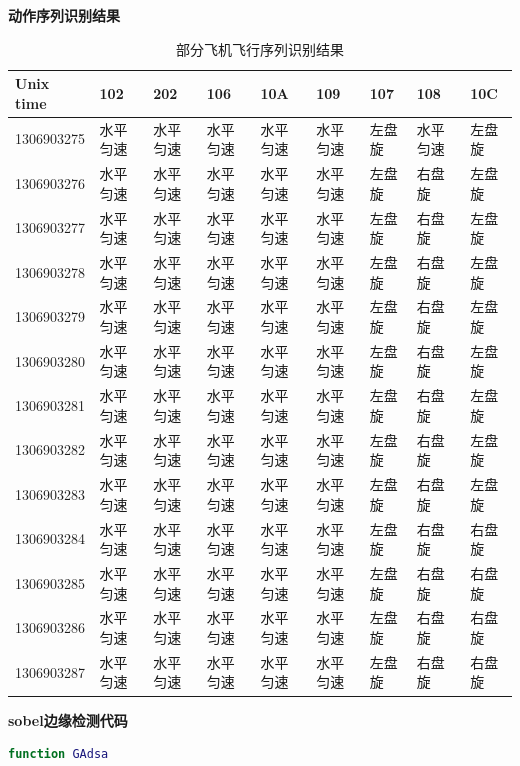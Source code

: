 \documentclass{my_paper}
\begin{document}
\textbf{动作序列识别结果}
\begin{table}
    \caption{部分飞机飞行序列识别结果} %
    \centering %
  
        \begin{tabular}{l|llllllll}
            \hline
        Unix time & 102 & 202 & 106 & 10A & 109 & 107 & 108 & 10C \\\hline
        1306903275 & 水平匀速 & 水平匀速 & 水平匀速 & 水平匀速 & 水平匀速 & 左盘旋 & 水平匀速 & 左盘旋 \\
        1306903276 & 水平匀速 & 水平匀速 & 水平匀速 & 水平匀速 & 水平匀速 & 左盘旋 & 右盘旋  & 左盘旋 \\
        1306903277 & 水平匀速 & 水平匀速 & 水平匀速 & 水平匀速 & 水平匀速 & 左盘旋 & 右盘旋  & 左盘旋 \\
        1306903278 & 水平匀速 & 水平匀速 & 水平匀速 & 水平匀速 & 水平匀速 & 左盘旋 & 右盘旋  & 左盘旋 \\
        1306903279 & 水平匀速 & 水平匀速 & 水平匀速 & 水平匀速 & 水平匀速 & 左盘旋 & 右盘旋  & 左盘旋 \\
        1306903280 & 水平匀速 & 水平匀速 & 水平匀速 & 水平匀速 & 水平匀速 & 左盘旋 & 右盘旋  & 左盘旋 \\
        1306903281 & 水平匀速 & 水平匀速 & 水平匀速 & 水平匀速 & 水平匀速 & 左盘旋 & 右盘旋  & 左盘旋 \\
        1306903282 & 水平匀速 & 水平匀速 & 水平匀速 & 水平匀速 & 水平匀速 & 左盘旋 & 右盘旋  & 左盘旋 \\
        1306903283 & 水平匀速 & 水平匀速 & 水平匀速 & 水平匀速 & 水平匀速 & 左盘旋 & 右盘旋  & 左盘旋 \\
        1306903284 & 水平匀速 & 水平匀速 & 水平匀速 & 水平匀速 & 水平匀速 & 左盘旋 & 右盘旋  & 右盘旋 \\
        1306903285 & 水平匀速 & 水平匀速 & 水平匀速 & 水平匀速 & 水平匀速 & 左盘旋 & 右盘旋  & 右盘旋 \\
        1306903286 & 水平匀速 & 水平匀速 & 水平匀速 & 水平匀速 & 水平匀速 & 左盘旋 & 右盘旋  & 右盘旋 \\
        1306903287 & 水平匀速 & 水平匀速 & 水平匀速 & 水平匀速 & 水平匀速 & 左盘旋 & 右盘旋  & 右盘旋\\\hline
        \end{tabular}
     
    \label{dongzuo}
    \end{table}


\textbf{sobel边缘检测代码}

\begin{lstlisting}[language=matlab]
    function GAdsa 
\end{lstlisting}
\end{document}
